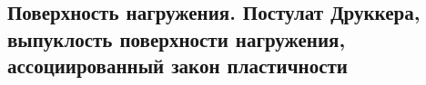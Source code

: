 

\subsection{Поверхность нагружения. Постулат Друккера, выпуклость поверхности нагружения, ассоциированный закон пластичности}



